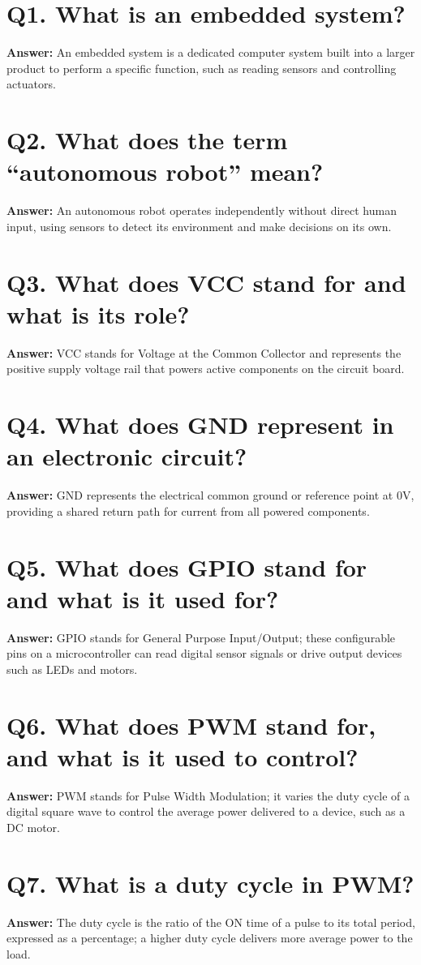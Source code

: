 \documentclass[12pt,a4paper,oneside]{report}
\begin{document}
\section{Q1. What is an embedded system?}
\textbf{Answer:} An embedded system is a dedicated computer system built into a larger product to perform a specific function, such as reading sensors and controlling actuators.

\section{Q2. What does the term ``autonomous robot'' mean?}
\textbf{Answer:} An autonomous robot operates independently without direct human input, using sensors to detect its environment and make decisions on its own.

\section{Q3. What does VCC stand for and what is its role?}
\textbf{Answer:} VCC stands for Voltage at the Common Collector and represents the positive supply voltage rail that powers active components on the circuit board.

\section{Q4. What does GND represent in an electronic circuit?}
\textbf{Answer:} GND represents the electrical common ground or reference point at 0V, providing a shared return path for current from all powered components.

\section{Q5. What does GPIO stand for and what is it used for?}
\textbf{Answer:} GPIO stands for General Purpose Input/Output; these configurable pins on a microcontroller can read digital sensor signals or drive output devices such as LEDs and motors.

\section{Q6. What does PWM stand for, and what is it used to control?}
\textbf{Answer:} PWM stands for Pulse Width Modulation; it varies the duty cycle of a digital square wave to control the average power delivered to a device, such as a DC motor.

\section{Q7. What is a duty cycle in PWM?}
\textbf{Answer:} The duty cycle is the ratio of the ON time of a pulse to its total period, expressed as a percentage; a higher duty cycle delivers more average power to the load.
\end{document}
